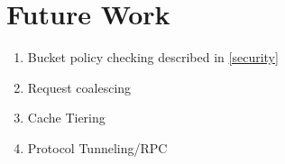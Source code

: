 \chapter{Future Work}
\begin{enumerate}
	\item Bucket policy checking described in \ref{security}
	\item Request coalescing
	\item Cache Tiering
	\item Protocol Tunneling/RPC
\end{enumerate}